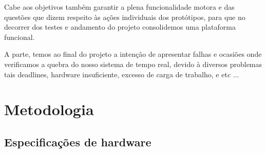 \documentclass{abnt}
\begin{document}
Cabe aos objetivos também garantir a plena funcionalidade motora e das questões
que dizem respeito às ações individuais dos protótipos, para que no decorrer
dos testes e andamento do projeto consolidemos uma plataforma funcional.

A parte, temos ao final do projeto a intenção de apresentar falhas e ocasiões
onde verificamos a quebra do nosso sistema de tempo real, devido à diversos
problemas tais deadlines, hardware insuficiente, excesso de carga de trabalho,
e etc ...   

\chapter{Metodologia} \label{metod}

\section{Especificações de hardware}
\end{document}
